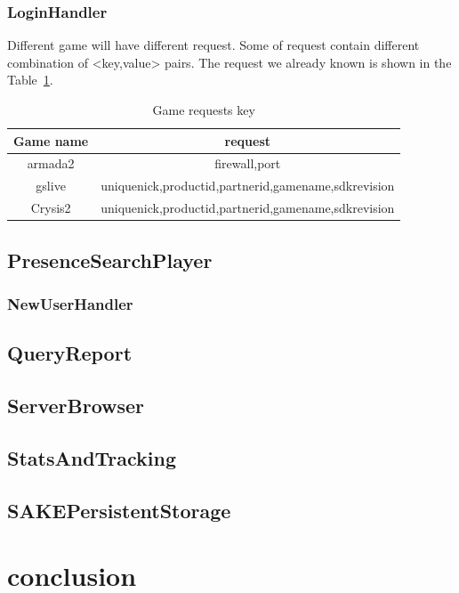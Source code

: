 \documentclass[oneside,titlepage,a4paper]{Definition/retrospy} %
\begin{document}
\subsection{LoginHandler}
Different game will have different request. Some of request contain different combination of <key,value> pairs. The request we already known is shown in the Table~\ref{Game requests key}.
\begin{table}[H]
	\centering
	\begin{tabular}{|c|c|}
		\hline 
		\textbf{Game name}&\textbf{request}  \\ 
		\hline 		
		armada2 & firewall,port \\
		\hline
		gslive& uniquenick,productid,partnerid,gamename,sdkrevision \\ 		
		\hline 
		Crysis2&uniquenick,productid,partnerid,gamename,sdkrevision \\
		\hline
	\end{tabular} 
	\caption{Game requests key}
	\label{Game requests key}
\end{table}
\section{PresenceSearchPlayer}
\subsection{NewUserHandler}

\section{QueryReport}
\section{ServerBrowser}
\section{StatsAndTracking}
\section{SAKEPersistentStorage}

\chapter{conclusion}
\end{document}
